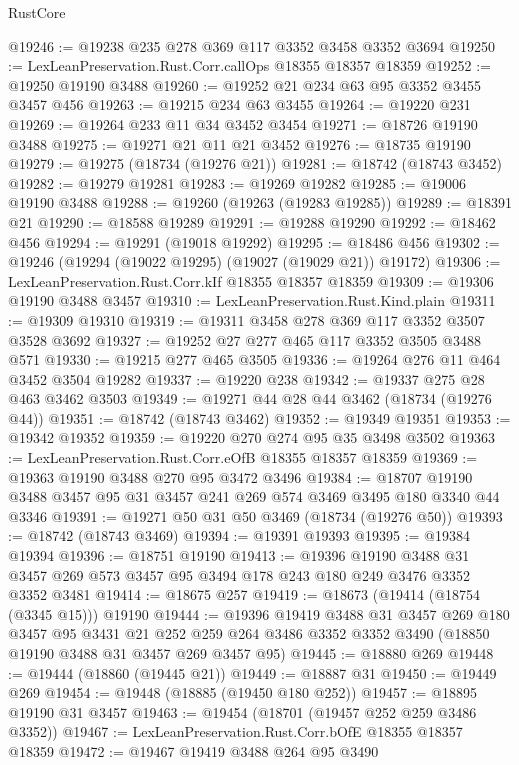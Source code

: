 \begin{lexlean}{RustCore}
\begin{coremodule}
@19246 := @19238 @235 @278 @369 @117 @3352 @3458 @3352 @3694
@19250 := LexLeanPreservation.Rust.Corr.callOps @18355 @18357 @18359
@19252 := @19250 @19190 @3488
@19260 := @19252 @21 @234 @63 @95 @3352 @3455 @3457 @456
@19263 := @19215 @234 @63 @3455
@19264 := @19220 @231
@19269 := @19264 @233 @11 @34 @3452 @3454
@19271 := @18726 @19190 @3488
@19275 := @19271 @21 @11 @21 @3452
@19276 := @18735 @19190
@19279 := @19275 (@18734 (@19276 @21))
@19281 := @18742 (@18743 @3452)
@19282 := @19279 @19281
@19283 := @19269 @19282
@19285 := @19006 @19190 @3488
@19288 := @19260 (@19263 (@19283 @19285))
@19289 := @18391 @21
@19290 := @18588 @19289
@19291 := @19288 @19290
@19292 := @18462 @456
@19294 := @19291 (@19018 @19292)
@19295 := @18486 @456
@19302 := @19246 (@19294 (@19022 @19295) (@19027 (@19029 @21)) @19172)
@19306 := LexLeanPreservation.Rust.Corr.kIf @18355 @18357 @18359
@19309 := @19306 @19190 @3488 @3457
@19310 := LexLeanPreservation.Rust.Kind.plain
@19311 := @19309 @19310
@19319 := @19311 @3458 @278 @369 @117 @3352 @3507 @3528 @3692
@19327 := @19252 @27 @277 @465 @117 @3352 @3505 @3488 @571
@19330 := @19215 @277 @465 @3505
@19336 := @19264 @276 @11 @464 @3452 @3504 @19282
@19337 := @19220 @238
@19342 := @19337 @275 @28 @463 @3462 @3503
@19349 := @19271 @44 @28 @44 @3462 (@18734 (@19276 @44))
@19351 := @18742 (@18743 @3462)
@19352 := @19349 @19351
@19353 := @19342 @19352
@19359 := @19220 @270 @274 @95 @35 @3498 @3502
@19363 := LexLeanPreservation.Rust.Corr.eOfB @18355 @18357 @18359
@19369 := @19363 @19190 @3488 @270 @95 @3472 @3496
@19384 := @18707 @19190 @3488 @3457 @95 @31 @3457 @241 @269 @574 @3469 @3495 @180 @3340 @44 @3346
@19391 := @19271 @50 @31 @50 @3469 (@18734 (@19276 @50))
@19393 := @18742 (@18743 @3469)
@19394 := @19391 @19393
@19395 := @19384 @19394
@19396 := @18751 @19190
@19413 := @19396
    @19190
    @3488
    @31
    @3457
    @269
    @573
    @3457
    @95
    @3494
    @178
    @243
    @180
    @249
    @3476
    @3352
    @3352
    @3481
@19414 := @18675 @257
@19419 := @18673 (@19414 (@18754 (@3345 @15))) @19190
@19444 := @19396
    @19419
    @3488
    @31
    @3457
    @269
    @180
    @3457
    @95
    @3431
    @21
    @252
    @259
    @264
    @3486
    @3352
    @3352
    @3490
    (@18850 @19190 @3488 @31 @3457 @269 @3457 @95)
@19445 := @18880 @269
@19448 := @19444 (@18860 (@19445 @21))
@19449 := @18887 @31
@19450 := @19449 @269
@19454 := @19448 (@18885 (@19450 @180 @252))
@19457 := @18895 @19190 @31 @3457
@19463 := @19454 (@18701 (@19457 @252 @259 @3486 @3352))
@19467 := LexLeanPreservation.Rust.Corr.bOfE @18355 @18357 @18359
@19472 := @19467 @19419 @3488 @264 @95 @3490

\end{coremodule}
\end{lexlean}
